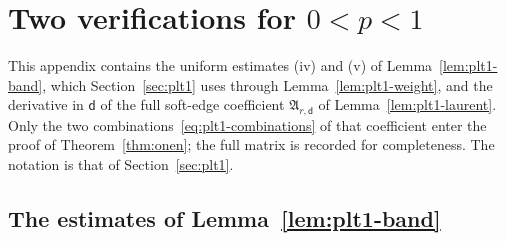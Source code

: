 
\section{\texorpdfstring{Two verifications for $0<p<1$}{Two verifications for 0<p<1}}\label{app:plt1-residues}

This appendix contains the uniform estimates (iv) and (v) of Lemma~\ref{lem:plt1-band}, which Section~\ref{sec:plt1}
uses through Lemma~\ref{lem:plt1-weight}, and the derivative in $\mathsf d$ of the full soft-edge coefficient
$\mathfrak A_{r,\mathsf d}$ of Lemma~\ref{lem:plt1-laurent}. Only the two combinations~\eqref{eq:plt1-combinations} of
that coefficient enter the proof of Theorem~\ref{thm:onen}; the full matrix is recorded for completeness. The notation
is that of Section~\ref{sec:plt1}.

\subsection{\texorpdfstring{The estimates of Lemma~\ref{lem:plt1-band}}{The estimates of Lemma 10.1}}

